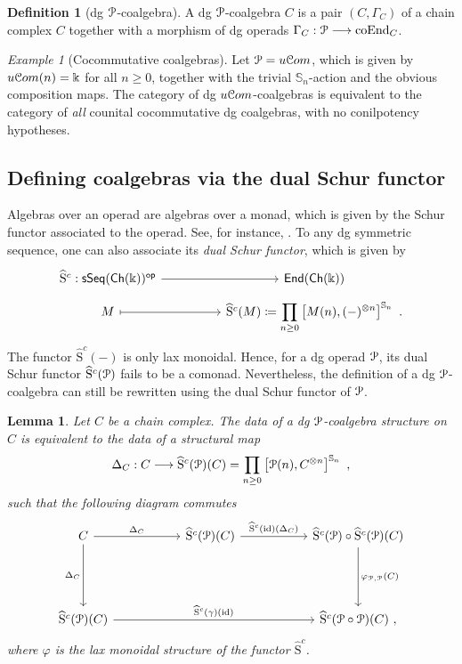 \documentclass[a4paper,12pt]{amsart}
\renewcommand{\mathcal}{\EuScript}
\newcommand{\baseonecat}{\mathsf{Ch}(\kk)}
\newcommand{\oneop}{\mathcal{P}}
\theoremstyle{plain}
\newtheorem{lemma}[theorem]{Lemma}%
\theoremstyle{definition}
\newtheorem{definition}[theorem]{Definition}%
\theoremstyle{remark}
\newtheorem{example}[theorem]{\sc Example}%
\newcommand{\kk}{\Bbbk}
\begin{document}
\begin{definition}[dg $\oneop$-coalgebra]
A dg $\oneop$-coalgebra $C$ is a pair $(C,\Gamma_C)$ of a chain complex $C$ together with a morphism of dg operads $\Gamma_C: \oneop \longrightarrow \mathrm{coEnd}_C$. 
\end{definition}

\begin{example}[Cocommutative coalgebras]
Let $\mathcal{P} = u\mathcal{C}om$, which is given by $u\mathcal{C}om(n) = \kk$ for all $n \geq 0$, together with the trivial $\mathbb{S}_n$-action and the obvious composition maps. The category of dg $u\mathcal{C}om$-coalgebras is equivalent to the category of \textit{all} counital cocommutative dg coalgebras, with no conilpotency hypotheses. 
\end{example}

\subsection{Defining coalgebras via the dual Schur functor}\label{set:1-dual schur}
Algebras over an operad are algebras over a monad, which is given by the Schur functor associated to the operad. See, for instance, \cite[Chapter 2]{Fresse09}. To any dg symmetric sequence, one can also associate its \textit{dual Schur functor}, which is given by
\[
\begin{tikzcd}[column sep=4pc,row sep=0.5pc]
\widehat{\mathrm{S}}^c : \mathsf{sSeq}(\mathsf{Ch}(\kk))^{\mathsf{op}} \arrow[r]
&\mathsf{End}(\baseonecat) \\
M \arrow[r,mapsto]
&\widehat{\mathrm{S}}^c(M) \coloneqq \displaystyle \prod_{n \geq 0} \left[M(n),(-)^{\otimes n}\right]^{\mathbb{S}_n}~.
\end{tikzcd}
\]
The functor $\widehat{\mathrm{S}}^c(-)$ is only lax monoidal. Hence, for a dg operad $\oneop$, its dual Schur functor $\widehat{\mathrm{S}}^c(\oneop)$ fails to be a comonad. Nevertheless, the definition of a dg $\oneop$-coalgebra can still be rewritten using the dual Schur functor of $\oneop$. 

\begin{lemma}\label{definition: P-coalgebra}
Let $C$ be a chain complex. The data of a dg $\oneop$-coalgebra structure on $C$ is equivalent to the data of a  structural map
\[
\Delta_C: C \longrightarrow \widehat{\mathrm{S}}^c(\oneop)(C)  = \displaystyle \prod_{n \geq 0} \left[\mathcal{P}(n),C^{\otimes n}\right]^{\mathbb{S}_n}~,
\]
such that the following diagram commutes 
\[
\begin{tikzcd}[column sep=4.5pc,row sep=4pc]
C \arrow[r,"\Delta_C"] \arrow[d,"\Delta_C",swap] 
&\widehat{\mathrm{S}}^c(\oneop)(C) \arrow[r,"\widehat{\mathrm{S}}^c(\mathrm{id})(\Delta_C)"]
&\widehat{\mathrm{S}}^c(\oneop) \circ \widehat{\mathrm{S}}^c(\oneop)(C) \arrow[d,"\varphi_{\oneop,\oneop}(C)"] \\
\widehat{\mathrm{S}}^c(\oneop)(C) \arrow[rr,"\widehat{\mathrm{S}}^c(\gamma)(\mathrm{id})"]
&
&\widehat{\mathrm{S}}^c(\oneop \circ \oneop)(C)~,
\end{tikzcd}
\]
where $\varphi$ is the lax monoidal structure of the functor $\widehat{\mathrm{S}}^c$. 
\end{lemma}
\end{document}
